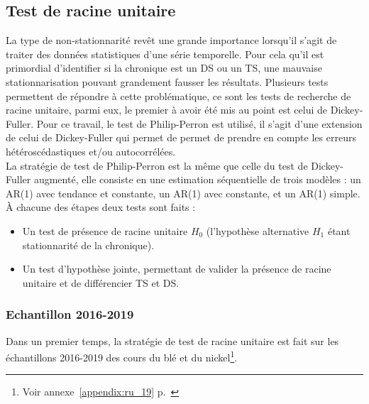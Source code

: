 \subsection{Test de racine unitaire}
La type de non-stationnarité revêt une grande importance lorsqu'il s'agit de traiter des données statistiques d'une série temporelle. Pour cela qu'il est
primordial d'identifier si la chronique est un DS ou un TS, une mauvaise stationnarisation pouvant grandement fausser les résultats. Plusieurs tests permettent de
répondre à cette problématique, ce sont les tests de recherche de racine unitaire, parmi eux, le premier à avoir été mis au point est celui de Dickey-Fuller. Pour ce
travail, le test de Philip-Perron est utilisé, il s'agit d'une extension de celui de Dickey-Fuller qui permet de permet de prendre en compte les erreurs hétéroscédastiques 
et/ou autocorrélées.\\[11pt]
La stratégie de test de Philip-Perron est la même que celle du test de Dickey-Fuller augmenté, elle consiste en une estimation séquentielle de trois modèles : un AR(1) 
avec tendance et constante, un AR(1) avec constante, et un AR(1) simple. À chacune des étapes deux tests sont faits :
\begin{itemize}
    \item Un test de présence de racine unitaire $H_{0}$ (l'hypothèse alternative $H_{1}$ étant stationnarité de la chronique).
    \item Un test d'hypothèse jointe, permettant de valider la présence de racine unitaire et de différencier TS et DS. 
\end{itemize}
%
\subsubsection{Echantillon 2016-2019}
Dans un premier temps, la stratégie de test de racine unitaire est fait sur les échantillons 2016-2019 des cours du blé et du nickel\footnote{Voir annexe~\ref{appendix:ru_19} p.~\pageref{appendix:ru_19}}.
